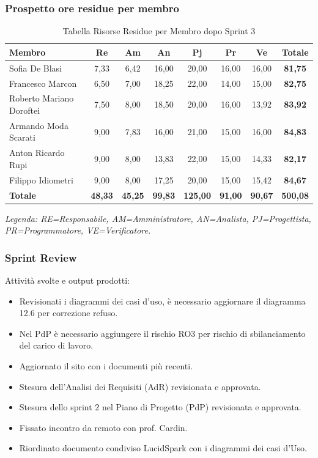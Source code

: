 \subsubsection{Prospetto ore residue per membro}
\begin{table}[H]
    \centering
    \renewcommand{\arraystretch}{1.3}
    \begin{tabularx}{\textwidth}{|X|c|c|c|c|c|c|c|}
        \hline
        \textbf{Membro} & \textbf{Re} & \textbf{Am} & \textbf{An} & \textbf{Pj} & \textbf{Pr} & \textbf{Ve} & \textbf{Totale} \\
        \hline
        Sofia De Blasi & 7,33 & 6,42 & 16,00 & 20,00 & 16,00 & 16,00 & \textbf{81,75} \\
        Francesco Marcon & 6,50 & 7,00 & 18,25 & 22,00 & 14,00 & 15,00 & \textbf{82,75} \\
        Roberto Mariano Doroftei & 7,50 & 8,00 & 18,50 & 20,00 & 16,00 & 13,92 & \textbf{83,92} \\
        Armando Moda Scarati & 9,00 & 7,83 & 16,00 & 21,00 & 15,00 & 16,00 & \textbf{84,83} \\
        Anton Ricardo Rupi & 9,00 & 8,00 & 13,83 & 22,00 & 15,00 & 14,33 & \textbf{82,17} \\
        Filippo Idiometri & 9,00 & 8,00 & 17,25 & 20,00 & 15,00 & 15,42 & \textbf{84,67} \\
        \hline
        \textbf{Totale} & \textbf{48,33} & \textbf{45,25} & \textbf{99,83} & \textbf{125,00} & \textbf{91,00} & \textbf{90,67} & \textbf{500,08} \\
        \hline
    \end{tabularx}
    \begin{minipage}{\textwidth}
        \smallskip
        \footnotesize\textit{Legenda: RE=Responsabile, AM=Amministratore,
        AN=Analista, PJ=Progettista, PR=Programmatore, VE=Verificatore.}
    \end{minipage}
    \caption{Tabella Risorse Residue per Membro dopo Sprint 3}
\end{table}

\subsubsection{Sprint Review}
Attività svolte e output prodotti:
\begin{itemize}
    \item Revisionati i diagrammi dei casi d'uso, è necessario aggiornare il diagramma 12.6 per correzione refuso.
    \item Nel PdP è necessario aggiungere il rischio RO3 per rischio di sbilanciamento del carico di lavoro.
    \item Aggiornato il sito con i documenti più recenti.
    \item Stesura dell'Analisi dei Requisiti (AdR) revisionata e approvata.
    \item Stesura dello sprint 2 nel Piano di Progetto (PdP) revisionata e approvata.
    \item Fissato incontro da remoto con prof. Cardin.
    \item Riordinato documento condiviso LucidSpark con i diagrammi dei casi d'Uso.
\end{itemize}

